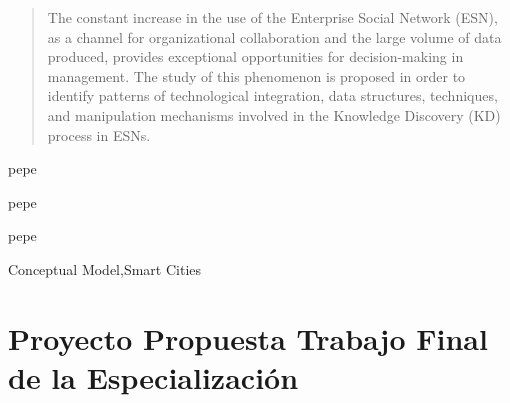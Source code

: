 \documentclass[a4paper,fleqn,spanish]{cas-dc}
\begin{document}
% 
% 
% 
% 
% 
% 



\nonumnote{}

\begin{abstract}
The constant increase in the use of the Enterprise Social Network (ESN), as a
channel for organizational collaboration and the large volume of data produced,
provides exceptional opportunities for decision-making in management. The study
of this phenomenon is proposed in order to identify patterns of technological
integration, data structures, techniques, and manipulation mechanisms involved
in the Knowledge Discovery (KD) process in ESNs.
\end{abstract}


\begin{highlights}
\item pepe
\item pepe
\item pepe
\end{highlights}


\begin{keywords}
Conceptual Model\sep Smart Cities
\end{keywords}
\maketitle
\section{Proyecto Propuesta Trabajo Final de la Especialización}\label{TFE}
\end{document}
